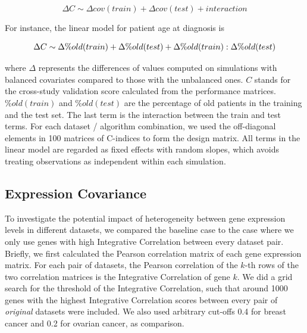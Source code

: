 \documentclass{bioinfo}
\begin{document}
  	\begin{equation}\label{linmod}
      \Delta C \sim \Delta cov(train) + \Delta cov(test) + interaction
    \end{equation}
    
    For instance, the linear model for patient age at diagnosis is
  
	
	\begin{equation}
		\footnotesize
		\Delta C \sim \Delta \%old(train) + \Delta \%old(test) + \Delta \%old(train):\Delta \%old(test)
	\end{equation}	
	
	where $\Delta$ represents the differences of values computed on
	simulations with balanced covariates compared to those with the unbalanced ones. $C$ stands for the cross-study validation score 
	calculated from the performance matrices. $\%old(train)$ and $\%old(test)$ are the percentage 
	of old patients in the training and the test set. The last term is the interaction 
	between the train and test terms. For each dataset / algorithm combination, we 
	used the off-diagonal elements in 100 matrices of C-indices to form the design matrix. All terms 
	in the linear model are regarded as fixed effects with random slopes, 
	which avoids treating observations as independent within each simulation. %
	
  \subsection{Expression Covariance}
  To investigate the potential impact of heterogeneity between gene
  expression levels in different datasets, we compared the baseline
  case to the case where we only use genes with
  high Integrative Correlation \citep{Parmigiani2004, Garrett-Mayer2008}
  between every dataset pair. Briefly, we first calculated the Pearson
  correlation matrix of each gene expression matrix. For each pair of
  datasets, the Pearson correlation of the $k$-th rows of the two
  correlation matrices is the Integrative Correlation of gene $k$. 
  We did a grid search for the threshold of the Integrative Correlation,
  such that around 1000 genes with
  the highest Integrative Correlation scores between every pair
  of \emph{original} datasets were included. We also used arbitrary cut-offs 0.4 for 
  breast cancer and 0.2 for ovarian cancer, as comparison.
\end{document}
